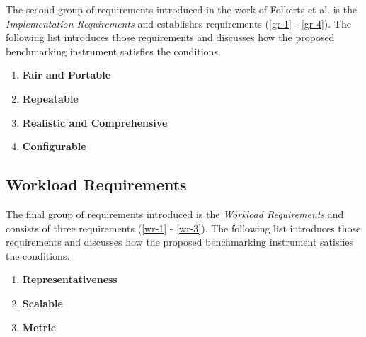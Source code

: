 The second group of requirements introduced in the work of Folkerts et al. is the \textit{Implementation Requirements} and establishes requirements (\ref{gr-1} - \ref{gr-4}). The following list introduces those requirements and discusses how the proposed benchmarking instrument satisfies the conditions.


\begin{enumerate}[label=\textbf{IR\arabic*}, leftmargin=3\parindent]
    \item \textbf{Fair and Portable}
    \label{ir-1}

    
    \item \textbf{Repeatable}
    \label{ir-2}
    
    \item \textbf{Realistic and Comprehensive}
    \label{ir-3}

    \item \textbf{Configurable}
    \label{ir-4}
\end{enumerate}


\subsection{Workload Requirements}
\label{sec:system:analysis:workload}
The final group of requirements introduced is the \textit{Workload Requirements} and consists of three requirements (\ref{wr-1} - \ref{wr-3}). The following list introduces those requirements and discusses how the proposed benchmarking instrument satisfies the conditions.

\begin{enumerate}[label=\textbf{WR\arabic*}, leftmargin=3\parindent]
    \item \textbf{Representativeness}
    \label{wr-1}
    
    \item \textbf{Scalable}
    \label{wr-2}
    
    \item \textbf{Metric}
    \label{wr-3}

\end{enumerate}